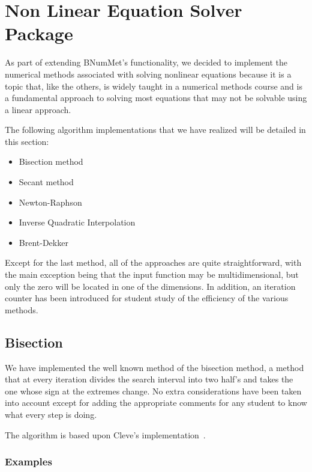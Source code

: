 \section{Non Linear Equation Solver Package}
As part of extending BNumMet's functionality, we decided to implement the numerical methods associated with solving nonlinear equations because it is a topic that, like the others, is widely taught in a numerical methods course and is a fundamental approach to solving most equations that may not be solvable using a linear approach.

The following algorithm implementations that we have realized will be detailed in this section:
\begin{itemize}
    \item Bisection method 
    \item Secant  method 
    \item Newton-Raphson 
    \item Inverse Quadratic Interpolation 
    \item Brent-Dekker  
\end{itemize}

Except for the last method, all of the approaches are quite straightforward, with the main exception being that the input function may be multidimensional, but only the zero will be located in one of the dimensions. In addition, an iteration counter has been introduced for student study of the efficiency of the various methods.

\subsection{Bisection}
We have implemented the well known method of the bisection method, a method that at every iteration divides the search interval into two half's and takes the one whose sign at the extremes change. No extra considerations have been taken into account except for adding the appropriate comments for any student to know what every step is doing.

The algorithm is based upon Cleve's implementation~\cite{doi:10.1137/1.9780898717952}.
\subsubsection{Examples}
	

